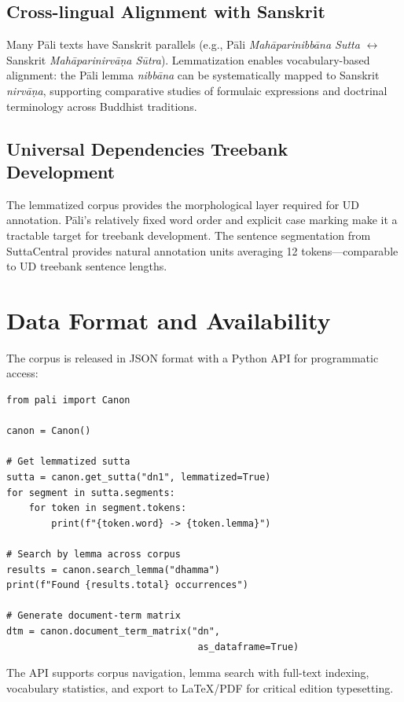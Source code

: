 \documentclass[11pt,twocolumn]{article}
\begin{document}
\subsection{Cross-lingual Alignment with Sanskrit}

Many Pāli texts have Sanskrit parallels (e.g., Pāli \emph{Mahāparinibbāna Sutta} $\leftrightarrow$ Sanskrit \emph{Mahāparinirvāṇa Sūtra}). Lemmatization enables vocabulary-based alignment: the Pāli lemma \emph{nibbāna} can be systematically mapped to Sanskrit \emph{nirvāṇa}, supporting comparative studies of formulaic expressions and doctrinal terminology across Buddhist traditions.

\subsection{Universal Dependencies Treebank Development}

The lemmatized corpus provides the morphological layer required for UD annotation. Pāli's relatively fixed word order and explicit case marking make it a tractable target for treebank development. The sentence segmentation from SuttaCentral provides natural annotation units averaging 12 tokens---comparable to UD treebank sentence lengths.

\section{Data Format and Availability}
\label{sec:format}

The corpus is released in JSON format with a Python API for programmatic access:

\begin{verbatim}
from pali import Canon

canon = Canon()

# Get lemmatized sutta
sutta = canon.get_sutta("dn1", lemmatized=True)
for segment in sutta.segments:
    for token in segment.tokens:
        print(f"{token.word} -> {token.lemma}")

# Search by lemma across corpus
results = canon.search_lemma("dhamma")
print(f"Found {results.total} occurrences")

# Generate document-term matrix
dtm = canon.document_term_matrix("dn",
                                  as_dataframe=True)
\end{verbatim}

The API supports corpus navigation, lemma search with full-text indexing, vocabulary statistics, and export to LaTeX/PDF for critical edition typesetting.
\end{document}
